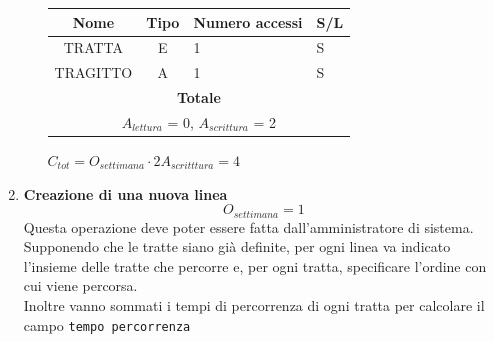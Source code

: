 \documentclass[12pt,a4paper]{report}
\begin{document}
\begin{enumerate}[label=\textbf{\arabic*}]
\begin{itemize}
\begin{center}
    \end{center}
    \begin{table}[H]
    \centering
    \begin{tabular}{|c|c|l|l|}
    \hline
    \textbf{Nome} & \textbf{Tipo} & \textbf{Numero accessi} & \textbf{S/L} \\
    \hline
    TRATTA & E & 1 & S \\
    \hline
    TRAGITTO & A & 1 & S \\
    \hline
    \multicolumn{4}{c}{\textbf{Totale}} \\
    \multicolumn{4}{c}{${A_{lettura}}$ = 0, ${A_{scrittura}}$ = 2} \\
    \hline
    \end{tabular}
    \end{table}
    \begin{center}
    ${C_{tot} = {O_{settimana}}\cdot{2A_{scritttura}}= 4}$
    \end{center}
    \end{itemize}



    \item\textbf{Creazione di una nuova linea} \label{op21} \\
	\[{O_{settimana} = 1}\]
	Questa operazione deve poter essere fatta dall'amministratore di sistema.\\
	Supponendo che le tratte siano già definite, per ogni linea va indicato l'insieme delle tratte che percorre e, per ogni tratta, specificare l'ordine con cui viene percorsa.\\
	Inoltre vanno sommati i tempi di percorrenza di ogni tratta per calcolare il campo \texttt{tempo percorrenza}


\end{enumerate}
\end{document}
